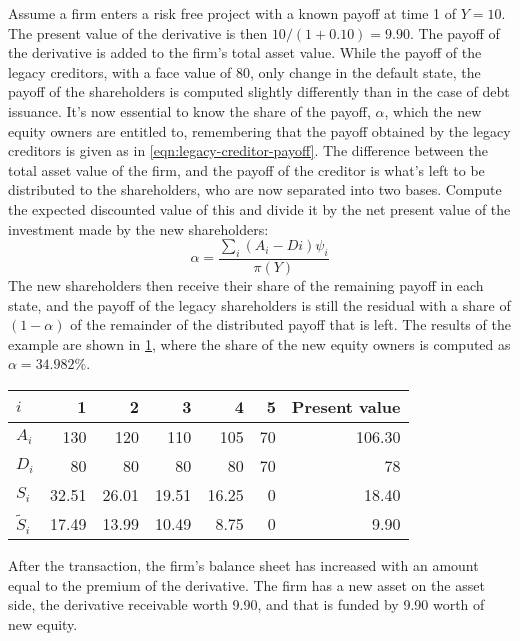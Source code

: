 \documentclass[../main.tex]{subfiles}
\begin{document}
        Assume a firm enters a risk free project with a known payoff at time 1 of $Y=10$. 
        The present value of the derivative is then $10/(1+0.10)=9.90$. 
        The payoff of the derivative is added to the firm's total asset value. 
        While the payoff of the legacy creditors, with a face value of 80, only change in the default state, the payoff of the shareholders is computed slightly differently than in the case of debt issuance. 
        It's now essential to know the share of the payoff, $\alpha$, which the new equity owners are entitled to, remembering that the payoff obtained by the legacy creditors is given as in \cref{eqn:legacy-creditor-payoff}. 
        The difference between the total asset value of the firm, and the payoff of the creditor is what's left to be distributed to the shareholders, who are now separated into two bases. 
        Compute the expected discounted value of this and divide it by the net present value of the investment made by the new shareholders:
        \begin{equation}
            \alpha = \frac{\sum_i (A_{i}-D{i})\psi_{i}}{\pi(Y)}
        \end{equation}
        The new shareholders then receive their share of the remaining payoff in each state, and the payoff of the legacy shareholders is still the residual with a share of $(1-\alpha)$ of the remainder of the distributed payoff that is left. 
        The results of the example are shown in \cref{tbl:equity-funding-payoff}, where the share of the new equity owners is computed as $\alpha = 34.982\%$.

        \begin{table}[h]
            \centering\begin{tabular}{l|rrrrr||r}
                $i$ & 1 & 2 & 3 & 4 & 5 & Present value \\
                \hline
                $A_{i}$ & 130 & 120 & 110 & 105 & 70 & 106.30 \\
                $D_{i}$ & 80 & 80 & 80 & 80 & 70 & 78 \\
                $S_{i}$ & 32.51 & 26.01 & 19.51 & 16.25 & 0 & 18.40 \\
                $\tilde{S}_{i}$ & 17.49 & 13.99 & 10.49 & 8.75 & 0 & 9.90 \\
            \end{tabular}
            \label{tbl:equity-funding-payoff}
        \end{table}

        After the transaction, the firm's balance sheet has increased with an amount equal to the premium of the derivative. 
        The firm has a new asset on the asset side, the derivative receivable worth 9.90, and that is funded by 9.90 worth of new equity.
\end{document}
